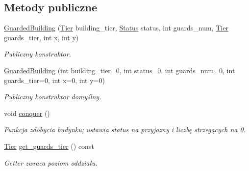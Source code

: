 \subsection*{Metody publiczne}
\begin{DoxyCompactItemize}
\item 
\hyperlink{classmodel_1_1GuardedBuilding_acd7faa9dc9d87371b33030b6f0223339}{Guarded\+Building} (\hyperlink{tier_8hpp_a50a003ab1ea342f138c038fabfd1ee55}{Tier} building\+\_\+tier, \hyperlink{status_8hpp_a822822ece62ee330ee656034849df887}{Status} status, int guards\+\_\+num, \hyperlink{tier_8hpp_a50a003ab1ea342f138c038fabfd1ee55}{Tier} guards\+\_\+tier, int x, int y)
\begin{DoxyCompactList}\small\item\em Publiczny konstruktor. \end{DoxyCompactList}\item 
\hyperlink{classmodel_1_1GuardedBuilding_aaf02e02d038198a6cb406505a07ff122}{Guarded\+Building} (int building\+\_\+tier=0, int status=0, int guards\+\_\+num=0, int guards\+\_\+tier=0, int x=0, int y=0)
\begin{DoxyCompactList}\small\item\em Publiczny konstruktor domyślny. \end{DoxyCompactList}\item 
\mbox{\label{classmodel_1_1GuardedBuilding_aa8c31f9ba289c4a2d5a69faf29ec6420}} 
void \hyperlink{classmodel_1_1GuardedBuilding_aa8c31f9ba289c4a2d5a69faf29ec6420}{conquer} ()
\begin{DoxyCompactList}\small\item\em Funkcja zdobycia budynku; ustawia status na przyjazny i liczbę strzegących na 0. \end{DoxyCompactList}\item 
\mbox{\label{classmodel_1_1GuardedBuilding_a7c2e4457eb1d29dd7b05268c1c5796e6}} 
\hyperlink{tier_8hpp_a50a003ab1ea342f138c038fabfd1ee55}{Tier} \hyperlink{classmodel_1_1GuardedBuilding_a7c2e4457eb1d29dd7b05268c1c5796e6}{get\+\_\+guards\+\_\+tier} () const
\begin{DoxyCompactList}\small\item\em Getter zwraca poziom oddziału. \end{DoxyCompactList}\item 
\mbox{\label{classmodel_1_1GuardedBuilding_aa06bc4f6b2ab78d37556a1395e6278dc}} 

\end{DoxyCompactItemize}
